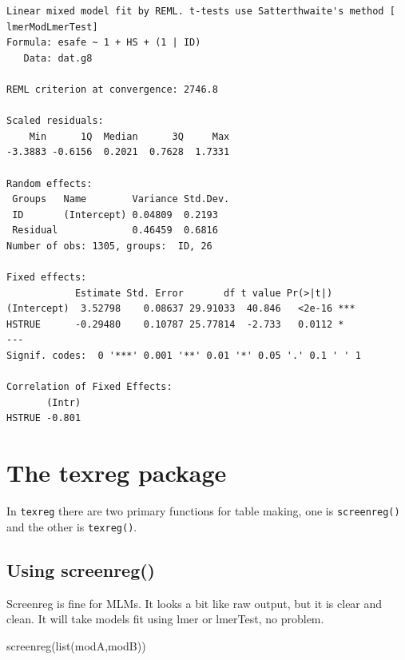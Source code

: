 \documentclass[
  letterpaper,
  DIV=11,
  numbers=noendperiod]{scrreprt}
\newenvironment{Shaded}{\begin{snugshade}}{\end{snugshade}}
\newcommand{\FunctionTok}[1]{\textcolor[rgb]{0.02,0.16,0.49}{#1}}
\newcommand{\NormalTok}[1]{\textcolor[rgb]{0.00,0.44,0.13}{#1}}
\begin{document}
\begin{verbatim}
Linear mixed model fit by REML. t-tests use Satterthwaite's method [
lmerModLmerTest]
Formula: esafe ~ 1 + HS + (1 | ID)
   Data: dat.g8

REML criterion at convergence: 2746.8

Scaled residuals: 
    Min      1Q  Median      3Q     Max 
-3.3883 -0.6156  0.2021  0.7628  1.7331 

Random effects:
 Groups   Name        Variance Std.Dev.
 ID       (Intercept) 0.04809  0.2193  
 Residual             0.46459  0.6816  
Number of obs: 1305, groups:  ID, 26

Fixed effects:
            Estimate Std. Error       df t value Pr(>|t|)    
(Intercept)  3.52798    0.08637 29.91033  40.846   <2e-16 ***
HSTRUE      -0.29480    0.10787 25.77814  -2.733   0.0112 *  
---
Signif. codes:  0 '***' 0.001 '**' 0.01 '*' 0.05 '.' 0.1 ' ' 1

Correlation of Fixed Effects:
       (Intr)
HSTRUE -0.801
\end{verbatim}

\hypertarget{the-texreg-package}{%
\section{The texreg package}\label{the-texreg-package}}

In \texttt{texreg} there are two primary functions for table making, one
is \texttt{screenreg()} and the other is \texttt{texreg()}.

\hypertarget{using-screenreg}{%
\subsection{Using screenreg()}\label{using-screenreg}}

Screenreg is fine for MLMs. It looks a bit like raw output, but it is
clear and clean. It will take models fit using lmer or lmerTest, no
problem.

\begin{Shaded}
\begin{Highlighting}[]
\FunctionTok{screenreg}\NormalTok{(}\FunctionTok{list}\NormalTok{(modA,modB))}
\end{Highlighting}
\end{Shaded}
\end{document}
